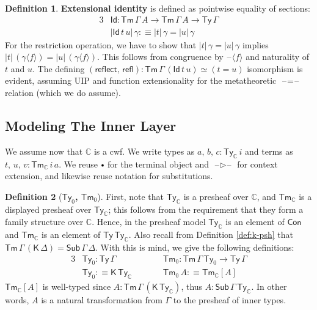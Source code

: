 \documentclass[12pt,a4paper,twoside,openany]{book}
\theoremstyle{remark}
\theoremstyle{definition}
\newtheorem{mydefinition}{Definition}
\theoremstyle{theorem}
\newcommand{\mbb}[1]{\mathbb{#1}}
\newcommand{\refl}{\mathsf{refl}}
\newcommand{\reflect}{\mathsf{reflect}}
\newcommand{\Con}{\mathsf{Con}}
\newcommand{\Sub}{\mathsf{Sub}}
\newcommand{\Tm}{\mathsf{Tm}}
\newcommand{\Ty}{\mathsf{Ty}}
\newcommand{\Id}{\mathsf{Id}}
\newcommand{\blank}{\mathord{\hspace{1pt}\text{--}\hspace{1pt}}}
\newcommand{\ext}{\triangleright}
\newcommand{\emptycon}{\scaleobj{.75}\bullet}
\newcommand{\K}{\mathsf{K}}
\newcommand{\mbbC}{\mbb{C}}
\newcommand{\lab}{\langle}
\newcommand{\rab}{\rangle}
\newcommand{\defn}{:\equiv}
\begin{document}
\begin{mydefinition}
\textbf{Extensional identity} is defined as pointwise equality of sections:
\begin{alignat*}{3}
  & \Id : \Tm\,\Gamma\,A \to \Tm\,\Gamma\,A \to \Ty\,\Gamma\\
  & |\Id\,t\,u|\,\gamma \defn |t|\,\gamma = |u|\,\gamma
\end{alignat*}
For the restriction operation, we have to show that $|t|\,\gamma = |u|\,\gamma$
implies $|t|\,(\gamma\lab f \rab) = |u|\,(\gamma \lab f \rab)$. This
follows from congruence by $\blank \lab f \rab$ and naturality of $t$ and
$u$.  The defining $(\reflect,\,\refl) : \Tm\,\Gamma\,(\Id\,t\,u) \simeq (t =
u)$ isomorphism is evident, assuming UIP and function extensionality for the
metatheoretic $\blank\!=\!\blank$ relation (which we do assume).
\end{mydefinition}

\subsection{Modeling The Inner Layer}

We assume now that $\mbbC$ is a cwf. We write types as $a,\,b,\,c :
\Ty_\mbbC\,i$ and terms as $t,\,u,\,v : \Tm_\mbbC\,i\,a$. We reuse $\emptycon$
for the terminal object and $\blank\ext\blank$ for context extension, and
likewise reuse notation for substitutions.

\begin{mydefinition}[\textbf{$\Ty_{0}$, $\Tm_{0}$}]
First, note that $\Ty_{\mbbC}$ is a presheaf over $\mbbC$, and $\Tm_{\mbbC}$ is
a displayed presheaf over $\Ty_{\mbbC}$; this follows from the requirement that
they form a family structure over $\mbbC$. Hence, in the presheaf model
$\Ty_{\mbbC}$ is an element of $\Con$ and $\Tm_{\mbbC}$ is an element of
$\Ty\,\Ty_{\mbbC}$. Also recall from Definition \ref{def:k-psh} that
$\Tm\,\Gamma\,(\K\,\Delta) = \Sub\,\Gamma\,\Delta$. With this is mind, we
give the following definitions:
\begin{alignat*}{3}
  & \Ty_0 : \Ty\,\Gamma                   && \Tm_0 : \Tm\,\Gamma\,\Ty_0 \to \Ty\,\Gamma\\
  & \Ty_0 \defn \K\,\Ty_{\mbbC}\hspace{2em} && \Tm_0\,A \defn \Tm_{\mbbC}[A]
\end{alignat*}
$\Tm_{\mbbC}[A]$ is well-typed since $A : \Tm\,\Gamma\,(\K\,\Ty_{\mbbC})$, thus
$A : \Sub\,\Gamma\,\Ty_{\mbbC}$. In other words, $A$ is a natural transformation
from $\Gamma$ to the presheaf of inner types.
\end{mydefinition}
\end{document}
